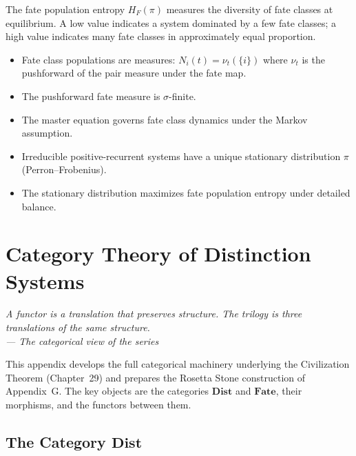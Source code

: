 \documentclass[12pt,twoside,openright]{book}
\newcommand{\catDist}{\mathbf{Dist}}
\newcommand{\catFate}{\mathbf{Fate}}
\newenvironment{epigraph}[2]{%
  \vspace{1em}\begin{flushright}
  \begin{minipage}{0.72\textwidth}
  \itshape\small #1\\[0.4em]
  \upshape\footnotesize\sffamily\color{DistGray}--- #2
  \end{minipage}\end{flushright}\vspace{1.5em}}{}
\providecommand{\catDist}{\mathbf{Dist}}
\providecommand{\catFate}{\mathbf{Fate}}
\newenvironment{appsummary}{%
  \begin{tcolorbox}[colback=DistBlue!5,colframe=DistBlue,
    title={\faBookOpen\enspace Appendix Summary},
    fonttitle=\sffamily\bfseries\color{white},
    attach boxed title to top left={yshift=-2mm,xshift=4mm},
    boxed title style={colback=DistBlue,rounded corners}]
  \begin{itemize}[nosep,leftmargin=*]}{%
  \end{itemize}\end{tcolorbox}}
\providecommand{\pushFate}{\nu}
\providecommand{\statDist}{\pi}
\providecommand{\fateEntropy}{H_{F}}
\begin{document}
The fate population entropy $\fateEntropy(\statDist)$
measures the diversity of fate classes at equilibrium.
A low value indicates a system dominated by a few fate
classes; a high value indicates many fate classes in
approximately equal proportion.

\begin{appsummary}
\item Fate class populations are measures: $N_i(t)=
  \pushFate_t(\{i\})$ where $\pushFate_t$ is the
  pushforward of the pair measure under the fate map.
\item The pushforward fate measure is $\sigma$-finite.
\item The master equation governs fate class dynamics
  under the Markov assumption.
\item Irreducible positive-recurrent systems have a unique
  stationary distribution $\statDist$ (Perron--Frobenius).
\item The stationary distribution maximizes fate population
  entropy under detailed balance.
\end{appsummary}


\chapter{Category Theory of Distinction Systems}
\label{app:categories}

\begin{epigraph}{A functor is a translation that preserves
  structure. The trilogy is three translations of the same
  structure.}{The categorical view of the series}
\end{epigraph}

This appendix develops the full categorical machinery
underlying the Civilization Theorem (Chapter~29) and
prepares the Rosetta Stone construction of Appendix~G.
The key objects are the categories $\catDist$ and $\catFate$,
their morphisms, and the functors between them.

\section{The Category $\catDist$}
\end{document}
